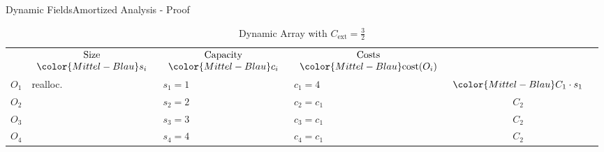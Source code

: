 
\begin{frame}{Dynamic Fields}{Amortized Analysis - Proof}
  \vspace*{-1.0em}%
  \begin{table}[!h]%
    \caption{Dynamic Array with %
      $C_\text{ext} = \frac{3}{2}$}%
    \label{tab:amortized_analysis_limit}%
    \vspace*{-1.5em}%
    \begin{tabular}{|l|l|l|l|c|@{}l}
      \cmidrule[\heavyrulewidth]{1-5}\addlinespace[-\belowrulesep]
      \multicolumn{2}{|c|}{$\begin{array}{c}
          \text{Operation}\\
          \text{(append)}
        \end{array}$} &
      $\begin{array}{c}
        \text{Size}\\
        {\color{Mittel-Blau}s_i}
      \end{array}$ &
      $\begin{array}{c}
        \text{Capacity}\\
        {\color{Mittel-Blau}c_i}
      \end{array}$ &
      $\begin{array}{c}
        \text{Costs}\\
        {\color{Mittel-Blau}\mathrm{cost}(O_i)}
      \end{array}$\\
      \addlinespace[-0.25\aboverulesep]\cmidrule[\heavyrulewidth]{1-5}
      $O_1$ & {\color{Mittel-Blau}realloc.} &
      $s_1 = 1$ & {\color{Mittel-Blau}$c_1 = 4$} &
      ${\color{Mittel-Blau}C_1 \cdot s_1}$ &
      \raisebox{-0.5em}{\multirow{4}{*}{%
        $\left.\begin{array}{@{}l@{}}\\[4.5em]\end{array}\right\rbrace
        \begin{array}{@{}l@{}}
           \text{distance}\\
           4 \geq \left\lfloor\dfrac{{\color{Mittel-Blau}s_1}}{2}\right\rfloor
        \end{array}$%
      }}\\
      $O_2$ & {} & $s_2 = 2$ & $c_2 = c_1$ & $C_2$\\
      $O_3$ & {} & $s_3 = 3$ & $c_3 = c_1$ & $C_2$\\
      $O_4$ & {} & $s_4 = 4$ & $c_4 = c_1$ & $C_2$\\

\end{tabular}
\end{table}
\end{frame}
